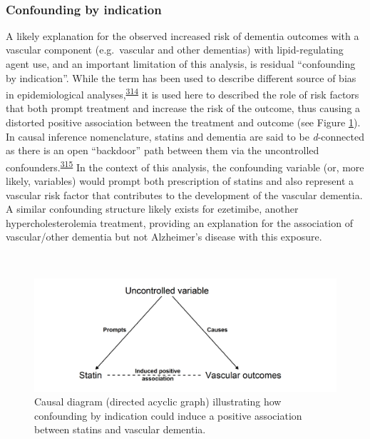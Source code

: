 \documentclass[a4paper, twoside]{templates/ociamthesis}
\begin{document}
~

\hypertarget{cprd-confounding-by-ind}{%
\subsubsection{Confounding by indication}\label{cprd-confounding-by-ind}}

A likely explanation for the observed increased risk of dementia outcomes with a vascular component (e.g.~vascular and other dementias) with lipid-regulating agent use, and an important limitation of this analysis, is residual ``confounding by indication''. While the term has been used to describe different source of bias in epidemiological analyses,\textsuperscript{\protect\hyperlink{ref-salas1999}{314}} it is used here to described the role of risk factors that both prompt treatment and increase the risk of the outcome, thus causing a distorted positive association between the treatment and outcome (see Figure \ref{fig:indicationBias}). In causal inference nomenclature, statins and dementia are said to be \emph{d}-connected as there is an open ``backdoor'' path between them via the uncontrolled confounders.\textsuperscript{\protect\hyperlink{ref-suttorp2015}{315}} In the context of this analysis, the confounding variable (or, more likely, variables) would prompt both prescription of statins and also represent a vascular risk factor that contributes to the development of the vascular dementia. A similar confounding structure likely exists for ezetimibe, another hypercholesterolemia treatment, providing an explanation for the association of vascular/other dementia but not Alzheimer's disease with this exposure.

~\\




\begin{figure}[H]

{\centering \includegraphics[width=0.8\linewidth]{figures/cprd-analysis/indicationBias} 

}

\caption[Confounding by indication causal diagram]{Causal diagram (directed acyclic graph) illustrating how confounding by indication could induce a positive association between statins and vascular dementia.}\label{fig:indicationBias}
\end{figure}
\end{document}
